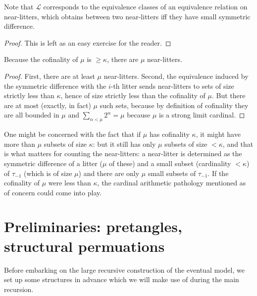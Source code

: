 \begin{lemma}
\label {lem:small-diff-equiv}
\leanok
{}
Note that $\mathcal L$ corresponds to the equivalence classes of an equivalence relation on near-litters, which obtains between two near-litters iff they have small symmetric difference.
\end{lemma}

\begin{proof}
\leanok
This is left as an easy exercise for the reader.
\end{proof}

\begin{lemma}
\label {lem:count-near-litters}
\leanok
{}
Because the cofinality of $\mu$ is $\geq \kappa$, there are $\mu$ near-litters.
\end{lemma}

\begin{proof}
\leanok
First, there are at least $\mu$ near-litters. Second, the equivalence induced by the symmetric difference with the $i$-th litter sends near-litters to sets of size strictly less than $\kappa$, hence of size strictly less than the cofinality of $\mu$. But there are at most (exactly, in fact) $\mu$ such sets, because by definition of cofinality they are all bounded in $\mu$ and $\sum_{\alpha < \mu} 2 ^ \alpha = \mu $ because $\mu$ is a strong limit cardinal.
\end{proof}

One might be concerned with the fact that if $\mu$ has cofinality $\kappa$, it might have more than $\mu$ subsets of size $\kappa$:  but it still has only $\mu$ subsets of size $<\kappa$, and that is what matters for counting the near-litters:  a near-litter is determined as the symmetric difference of a litter ($\mu$ of these) and a small subset (cardinality $<\kappa$) of $\tau_{-1}$ (which is of size $\mu$) and there are only $\mu$ small subsets of $\tau_{-1}$.  If the cofinality of $\mu$ were less than $\kappa$, the cardinal arithmetic pathology mentioned as of concern could come into play.

\section{Preliminaries: pretangles, structural permuations}

Before embarking on the large recursive construction of the eventual model, we set up some structures in advance which we will make use of during the main recursion.


